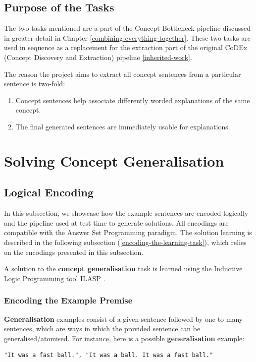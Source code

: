 \subsection{Purpose of the Tasks}

The two tasks mentioned are a part of the Concept Bottleneck pipeline discussed in greater detail in Chapter \ref{combining-everything-together}.
These two tasks are used in sequence as a replacement for the extraction part of the original CoDEx (Concept Discovery and Extraction) pipeline \ref{inherited-work}.

The reason the project aims to extract all concept sentences from a particular sentence is two-fold:
\begin{enumerate}
    \item Concept sentences help associate differently worded explanations of the same concept.
    \item The final generated sentences are immediately usable for explanations.
\end{enumerate}

\section{Solving Concept Generalisation}

\subsection{Logical Encoding}
\label{logical-encoding}

In this subsection, we showcase how the example sentences are encoded logically and the pipeline used at test time to generate solutions.
All encodings are compatible with the Answer Set Programming \cite{RefWorks:RefID:1-lifschitz2008answer} paradigm.
The solution learning is described in the following subsection (\ref{encoding-the-learning-task}), which relies on the encodings presented in this subsection. 


A solution to the \textbf{concept generalisation} task is learned using the Inductive Logic Programming tool ILASP \cite{RefWorks:RefID:18-law2020ilasp}.

\subsubsection{Encoding the Example Premise}

\textbf{Generalisation} examples consist of a given sentence followed by one to many sentences, which are ways in which the provided sentence can be generalised/atomised.
For instance, here is a possible \textbf{generalisation} example:
\begin{verbatim}
"It was a fast ball.", "It was a ball. It was a fast ball."
\end{verbatim}


